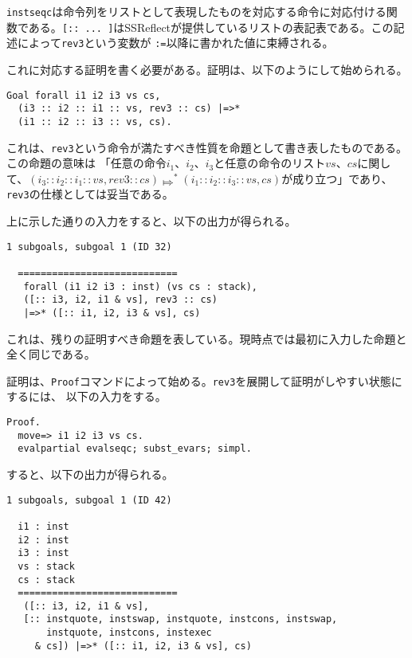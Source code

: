 \documentclass[a4paper, 10pt, twocolumn, titlepage]{ujarticle}
\renewcommand{\{}{\symbol{"7B}}
\renewcommand{\}}{\symbol{"7D}}
\begin{document}
\texttt{instseqc}は命令列をリストとして表現したものを対応する命令に対応付ける関数である。\texttt{[::
... ]}はSSReflectが提供しているリストの表記表である。この記述によって\texttt{rev3}という変数が
\texttt{:=}以降に書かれた値に束縛される。

これに対応する証明を書く必要がある。証明は、以下のようにして始められる。

\begin{lstlisting}[style=plain]
Goal forall i1 i2 i3 vs cs,
  (i3 :: i2 :: i1 :: vs, rev3 :: cs) |=>*
  (i1 :: i2 :: i3 :: vs, cs).
\end{lstlisting}

これは、\texttt{rev3}という命令が満たすべき性質を命題として書き表したものである。この命題の意味は
「任意の命令$i_1$、$i_2$、$i_3$と任意の命令のリスト$\mathit{vs}$、$\mathit{cs}$に関して、$(i_3 ::
i_2 :: i_1 :: \mathit{vs}, \mathit{rev3} :: \mathit{cs}) \Mapsto^* (i_1 :: i_2 :: i_3 ::
\mathit{vs}, \mathit{cs})$が成り立つ」であり、\texttt{rev3}の仕様としては妥当である。

上に示した通りの入力をすると、以下の出力が得られる。

\begin{lstlisting}[style=plain]
1 subgoals, subgoal 1 (ID 32)
  
  ============================
   forall (i1 i2 i3 : inst) (vs cs : stack),
   ([:: i3, i2, i1 & vs], rev3 :: cs)
   |=>* ([:: i1, i2, i3 & vs], cs)
\end{lstlisting}

これは、残りの証明すべき命題を表している。現時点では最初に入力した命題と全く同じである。

証明は、\texttt{Proof}コマンドによって始める。\texttt{rev3}を展開して証明がしやすい状態にするには、
以下の入力をする。

\begin{lstlisting}[style=plain]
Proof.
  move=> i1 i2 i3 vs cs.
  evalpartial evalseqc; subst_evars; simpl.
\end{lstlisting}

すると、以下の出力が得られる。

\begin{lstlisting}[style=plain]
1 subgoals, subgoal 1 (ID 42)
  
  i1 : inst
  i2 : inst
  i3 : inst
  vs : stack
  cs : stack
  ============================
   ([:: i3, i2, i1 & vs],
   [:: instquote, instswap, instquote, instcons, instswap,
       instquote, instcons, instexec
     & cs]) |=>* ([:: i1, i2, i3 & vs], cs)
\end{lstlisting}
\end{document}
